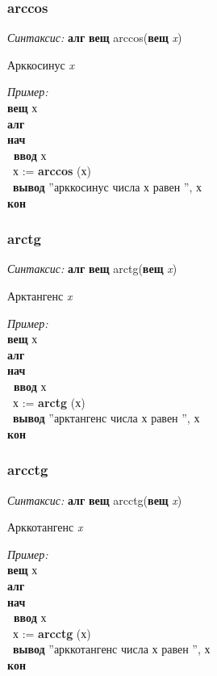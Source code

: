 \documentclass[12pt,a4paper]{article}
\newcommand{\otstup}{\textperiodcentered\ }
\begin{document}
\normalfont
\subsubsection{arccos}

\emph{Синтаксис:} \textbf{алг} \textbf{вещ} arccos(\textbf{вещ} \emph{x})


      
		
Арккосинус \emph{x}

\emph{Пример:}  
\sffamily
~\\\textbf{вещ} х
~\\\textbf{алг 
~\\нач
~\\\otstup ввод} х
~\\\otstup х := \textbf{arccos} (х)
~\\\otstup \textbf{вывод} ''арккосинус числа х равен '', х
~\\\textbf{кон}


\normalfont
\subsubsection{arctg}

\emph{Синтаксис:} \textbf{алг} \textbf{вещ} arctg(\textbf{вещ} \emph{x})


      
	
	Арктангенс \emph{x}
      
\emph{Пример:}  
\sffamily
~\\\textbf{вещ} х
~\\\textbf{алг 
~\\нач
~\\\otstup ввод} х
~\\\otstup х := \textbf{arctg} (х)
~\\\otstup \textbf{вывод} ''арктангенс числа х равен '', х
~\\\textbf{кон}

\normalfont
\subsubsection{arcctg}

\emph{Синтаксис:} \textbf{алг} \textbf{вещ} arcctg(\textbf{вещ} \emph{x})


      
		
Арккотангенс \emph{x}
      
\emph{Пример:}
\sffamily
~\\\textbf{вещ} х
~\\\textbf{алг 
~\\нач
~\\\otstup ввод} х
~\\\otstup х := \textbf{arcctg} (х)
~\\\otstup \textbf{вывод} ''арккотангенс числа х равен '', х
~\\\textbf{кон}
\end{document}
